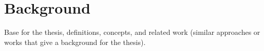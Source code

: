 \chapter{Background}

Base for the thesis, definitions, concepts, and related work (similar approaches or works that give a background for the thesis).
